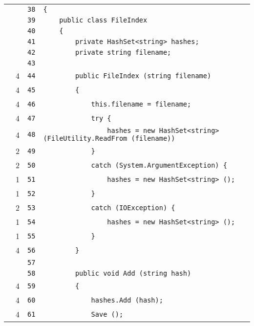 \documentclass[a4paper,10pt]{article}
\begin{document}
\begin{longtable}[l]{lrrl}
\cellcolor{gray} &  & \verb~38~ & \verb~{~\\
\cellcolor{gray} &  & \verb~39~ & \verb~    public class FileIndex~\\
\cellcolor{gray} &  & \verb~40~ & \verb~    {~\\
\cellcolor{gray} &  & \verb~41~ & \verb~        private HashSet<string> hashes;~\\
\cellcolor{gray} &  & \verb~42~ & \verb~        private string filename;~\\
\cellcolor{gray} &  & \verb~43~ & \verb~~\\
\cellcolor{green} & 4 & \verb~44~ & \verb~        public FileIndex (string filename)~\\
\cellcolor{green} & 4 & \verb~45~ & \verb~        {~\\
\cellcolor{green} & 4 & \verb~46~ & \verb~            this.filename = filename;~\\
\cellcolor{green} & 4 & \verb~47~ & \verb~            try {~\\
\cellcolor{green} & 4 & \verb~48~ & \verb~                hashes = new HashSet<string> (FileUtility.ReadFrom (filename))~\\
\cellcolor{green} & 2 & \verb~49~ & \verb~            }~\\
\cellcolor{green} & 2 & \verb~50~ & \verb~            catch (System.ArgumentException) {~\\
\cellcolor{green} & 1 & \verb~51~ & \verb~                hashes = new HashSet<string> ();~\\
\cellcolor{green} & 1 & \verb~52~ & \verb~            }~\\
\cellcolor{green} & 2 & \verb~53~ & \verb~            catch (IOException) {~\\
\cellcolor{green} & 1 & \verb~54~ & \verb~                hashes = new HashSet<string> ();~\\
\cellcolor{green} & 1 & \verb~55~ & \verb~            }~\\
\cellcolor{green} & 4 & \verb~56~ & \verb~        }~\\
\cellcolor{gray} &  & \verb~57~ & \verb~~\\
\cellcolor{gray} &  & \verb~58~ & \verb~        public void Add (string hash)~\\
\cellcolor{green} & 4 & \verb~59~ & \verb~        {~\\
\cellcolor{green} & 4 & \verb~60~ & \verb~            hashes.Add (hash);~\\
\cellcolor{green} & 4 & \verb~61~ & \verb~            Save ();~\\

\end{longtable}
\end{document}

